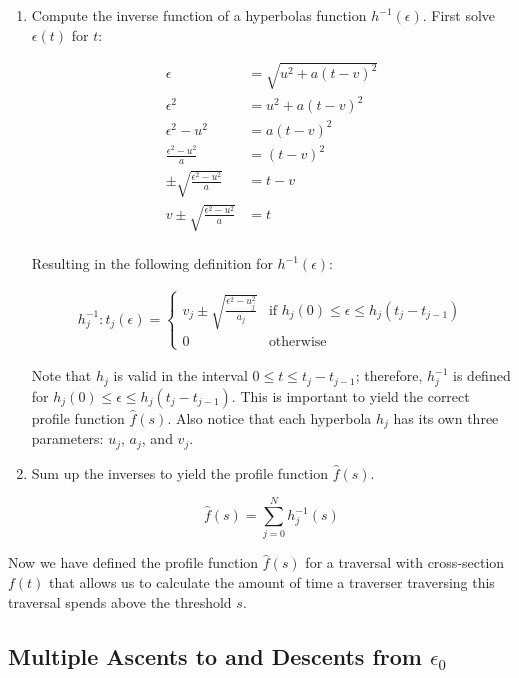 \begin{enumerate}
	\item Compute the inverse function of a hyperbolas function $h^{-1}(\epsilon)$. First solve $\epsilon(t)$ for $t$:
	
	\begin{align*}
		\epsilon & = \sqrt{u^2 + a(t - v)^2}\\
		\epsilon^2 & = u^2 + a(t - v)^2\\
		\epsilon^2 - u^2 & = a(t - v)^2\\
		\frac{\epsilon^2 - u^2}{a} & = (t - v)^2\\
		\pm\sqrt{\frac{\epsilon^2 - u^2}{a}} & = t - v\\
		v \pm \sqrt{\frac{\epsilon^2 - u^2}{a}} & = t\\
	\end{align*}
	
	Resulting in the following definition for $h^{-1}(\epsilon)$:
	
	\begin{align}
		h_j^{-1}: t_j(\epsilon) = 
		\begin{cases}
   			{v_j \pm \sqrt{\frac{\epsilon^2 - u_j^2}{a_j}}}	& \text{if } {h_j(0) \leq \epsilon \leq h_j(t_j - t_{j-1})}\\
   			0        										& \text{otherwise}
  		\end{cases} \label{eq:hinv}
  	\end{align}
	
	Note that $h_j$ is valid in the interval $0 \leq t \leq t_j - t_{j-1}$; therefore, $h_j^{-1}$ is defined for $h_j(0) \leq \epsilon \leq h_j(t_j - t_{j-1})$. This is important to yield the correct profile function $\hat{f}(s)$. Also notice that each hyperbola $h_j$ has its own three parameters: $u_j$, $a_j$, and $v_j$.
	
	\item Sum up the inverses to yield the profile function $\hat{f}(s)$.
	
	$$\hat{f}(s) = \sum_{j=0}^N {h_j^{-1}(s)}$$
	
\end{enumerate} 

Now we have defined the profile function $\hat{f}(s)$ for a traversal with cross-section $f(t)$ that allows us to calculate the amount of time a traverser traversing this traversal spends above the threshold $s$.

\subsection{Multiple Ascents to and Descents from $\epsilon_0$}


